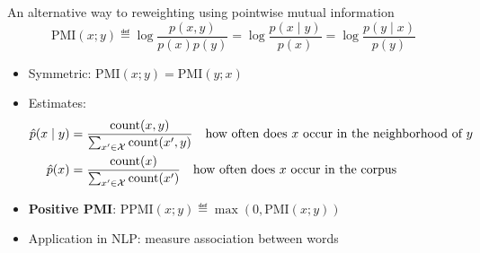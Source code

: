 \documentclass[usenames,dvipsnames,notes,11pt,aspectratio=169]{beamer}
\begin{document}
\begin{frame}
    {An alternative way to reweighting using pointwise mutual information}
    $$
    \text{PMI}(x;y) \eqdef \log \frac{p(x,y)}{p(x)p(y)}
    = \log\frac{p(x\mid y)}{p(x)}
    = \log\frac{p(y\mid x)}{p(y)}
    $$
    \pause
    \vspace{-1em}
    \begin{itemize}[<+->]
        \itemsep1em
        \item Symmetric: $\text{PMI}(x;y)=\text{PMI}(y;x)$
        \item Estimates:
            \begin{align*}
                \hat{p}(x\mid y) &= \frac{\text{count}(x,y)}{\sum_{x'\in\mathcal{X}}\text{count}(x', y)} \quad \text{how often does $x$ occur in the neighborhood of $y$}\\
                \hat{p}(x) &= \frac{\text{count}(x)}{\sum_{x'\in\mathcal{X}}\text{count}(x')}
                \quad \text{how often does $x$ occur in the corpus}
            \end{align*}
        \item {\bf Positive PMI}: $\text{PPMI}(x;y) \eqdef \max(0, \text{PMI}(x;y))$
        \item Application in NLP: measure association between words 
    \end{itemize}
\end{frame}

\end{document}
